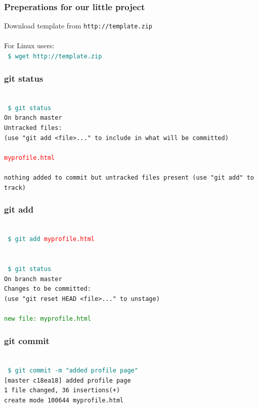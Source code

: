 \documentclass[aspectratio=169]{beamer}
\newcommand{\shellcmd}[1]{~\\ \indent\indent\texttt{\textcolor{teal}{ \$ #1}\\}}
\begin{document}

\begin{frame}
\frametitle{Preperations for our little project}
Download template from
\texttt{http://template.zip}
\\~\\
For Linux users:
\shellcmd{wget http://template.zip}
\end{frame}


\begin{frame}
\frametitle{git status}
\shellcmd{git status}
\texttt{On branch master\\
	Untracked files:\\
	(use "git add <file>..." to include in what will be committed)\\
	~\\
	\hspace{1cm}\textcolor{red}{myprofile.html}\\
	~\\
	nothing added to commit but untracked files present (use "git add" to track)}

\end{frame}


\begin{frame}
\frametitle{git add}

\shellcmd{git add \textcolor{red}{myprofile.html}}
~\\
\shellcmd{git status}
\texttt{On branch master\\
	Changes to be committed:\\
	(use "git reset HEAD <file>..." to unstage)\\
	~\\
	\hspace{1cm}\textcolor{green}{new file:   myprofile.html}
}
\end{frame}


\begin{frame}
\frametitle{git commit}
\shellcmd{git commit -m "added profile page"}
\texttt{[master c18ea18] added profile page\\
	1 file changed, 36 insertions(+)\\
	create mode 100644 myprofile.html
}
\end{frame}
\end{document}
